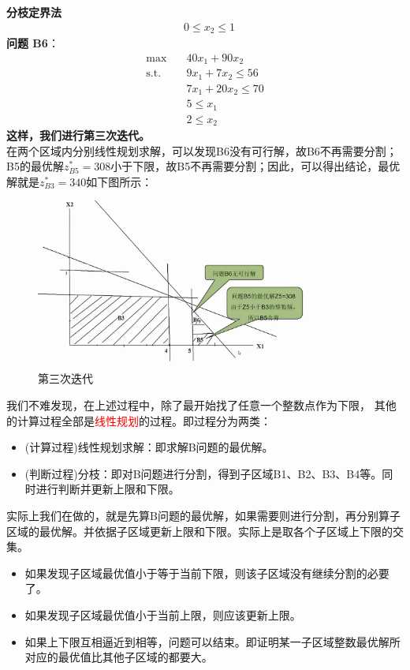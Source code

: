 \begin{exbox}{\textbf{分枝定界法}}
\begin{align*}
        & 0 \leq x_2 \leq 1
        \end{align*}
        \textbf{问题 B6}：
        \begin{align*}
        \max \quad & 40x_1 + 90x_2 \\
        \text{s.t.} \quad & 9x_1 + 7x_2 \leq 56 \\
        & 7x_1 + 20x_2 \leq 70 \\
        & 5 \leq x_1 \\
        & 2 \leq x_2
        \end{align*}
        \textbf{这样，我们进行第三次迭代。}\\
        在两个区域内分别线性规划求解，可以发现B6没有可行解，故B6不再需要分割；B5的最优解$z_{B5}^* = 308$小于下限，故B5不再需要分割；因此，可以得出结论，最优解就是$z_{B3}^* = 340$如下图所示：
        \begin{figure}[H]
            \centering
            \includegraphics[width=0.8\textwidth]{./image/14.png}
            \caption{第三次迭代}
            \label{fig:Chapter4_Temporary_Pavilion_4}
        \end{figure}

        \end{exbox}
        我们不难发现，在上述过程中，除了最开始找了任意一个整数点作为下限，
        其他的计算过程全部是\textcolor{red}{线性规划}的过程。即过程分为两类：
        \begin{itemize}
            \item (计算过程)线性规划求解：即求解B问题的最优解。
            \item (判断过程)分枝：即对B问题进行分割，得到子区域B1、B2、B3、B4等。同时进行判断并更新上限和下限。
        \end{itemize}
        实际上我们在做的，就是先算B问题的最优解，如果需要则进行分割，再分别算子区域的最优解。并依据子区域更新上限和下限。实际上是取各个子区域上下限的交集。
        \begin{itemize}
            \item 如果发现子区域最优值小于等于当前下限，则该子区域没有继续分割的必要了。
            \item 如果发现子区域最优值小于当前上限，则应该更新上限。
            \item 如果上下限互相逼近到相等，问题可以结束。即证明某一子区域整数最优解所对应的最优值比其他子区域的都要大。
        \end{itemize}
